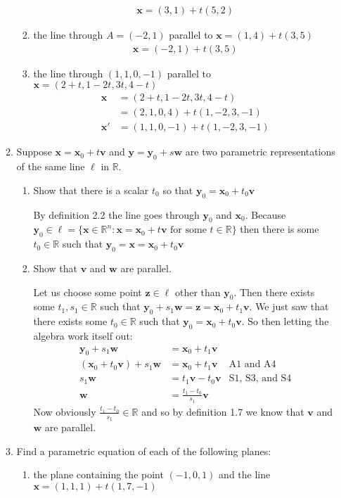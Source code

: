 \documentclass[letterpaper]{article}
\begin{document}
\begin{enumerate}
\begin{enumerate}
\begin{enumerate}
\begin{align*}
      \mathbf{x}=(3,1)+t(5,2)
    \end{align*}
    \item
    the line through $A=(-2,1)$ parallel to $\mathbf{x}=(1,4)+t(3,5)$
    \begin{align*}
      \mathbf{x}=(-2,1)+t(3,5)
    \end{align*}
    \setcounter{enumiii}{7}
    \item
    the line through $(1, 1, 0, -1)$ parallel to $\mathbf{x}=(2+t,1-2t,3t,4-t)$
    \begin{align*}
      \mathbf{x}&=(2+t,1-2t,3t,4-t)\\
      &=(2,1,0,4)+t(1,-2,3,-1)\\
      \mathbf{x}'&=(1,1,0,-1)+t(1,-2,3,-1)
    \end{align*}
    \end{enumerate}
  \item
  Suppose $\mathbf{x}=\mathbf{x}_0+t\mathbf{v}$ and $\mathbf{y}=\mathbf{y}_0+s\mathbf{w}$ are two parametric representations of the same line $\ell$ in $\mathbb{R}$.
    \begin{enumerate}
    \item
    Show that there is a scalar $t_0$ so that $\mathbf{y}_0=\mathbf{x}_0+t_0\mathbf{v}$

    By definition 2.2 the line goes through $\mathbf{y}_0$ and $\mathbf{x}_0$. Because $\mathbf{y}_0\in\ell=\{\mathbf{x}\in \mathbb{R}^n:\mathbf{x}=\mathbf{x}_0+t\mathbf{v}\text{ for some }t\in \mathbb{R}\}$ then there is some $t_0\in\mathbb{R}$ such that $\mathbf{y}_0=\mathbf{x}=\mathbf{x}_0+t_0\mathbf{v}$
    \item
    Show that $\mathbf{v}$ and $\mathbf{w}$ are parallel.

    Let us choose some point $\mathbf{z}\in \ell$ other than $\mathbf{y}_0$. Then there exists some $t_1,s_1\in \mathbb{R}$ such that $\mathbf{y}_0+s_1\mathbf{w}=\mathbf{z}=\mathbf{x}_0+t_1\mathbf{v}$. We just saw that there exists some $t_0\in \mathbb{R}$ such that $\mathbf{y}_0=\mathbf{x}_0+t_0\mathbf{v}$. So then letting the algebra work itself out:
    \begin{align*}
      \mathbf{y}_0+s_1\mathbf{w}&=\mathbf{x}_0+t_1\mathbf{v}\\
      (\mathbf{x}_0+t_0\mathbf{v})+s_1\mathbf{w}&=\mathbf{x}_0+t_1\mathbf{v}& \text{A1 and A4}\\
      s_1\mathbf{w}&=t_1\mathbf{v}-t_0\mathbf{v}& \text{S1, S3, and S4}\\
      \mathbf{w}&=\frac{t_1-t_0}{s_1}\mathbf{v}
    \end{align*}
    Now obviously $\frac{t_1-t_0}{s_1}\in \mathbb{R}$ and so by definition 1.7 we know that $\mathbf{v}$ and $\mathbf{w}$ are parallel.
    \end{enumerate}
  \setcounter{enumii}{9}
  \item
  Find a parametric equation of each of the following planes:
    \begin{enumerate}
    \item
    the plane containing the point $(-1,0,1)$ and the line $\mathbf{x}=(1,1,1)+t(1,7,-1)$


\end{enumerate}
\end{enumerate}
\end{enumerate}
\end{document}
